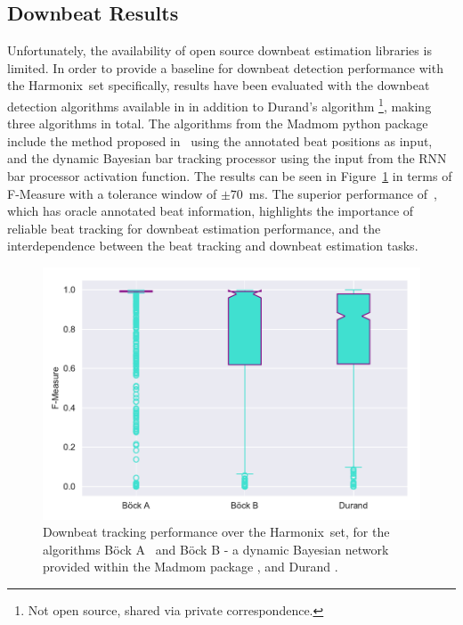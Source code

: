 \documentclass{article}
\newcommand{\setName}{Harmonix}
\begin{document}
\subsection{Downbeat Results}

Unfortunately, the availability of open source downbeat estimation libraries is limited. In order to provide a baseline for downbeat detection performance
with the \setName~set specifically, results have been evaluated with the downbeat detection algorithms available in \cite{Bock2016b} in addition to Durand's algorithm \cite{Durand2016}\footnote{Not open source, shared via private correspondence.}, making three algorithms in total.
The algorithms from the Madmom python package \cite{Bock2016b} include the method proposed in~\cite{Bock2016} using the annotated beat positions as input, and the dynamic Bayesian bar tracking processor using the input from the RNN bar processor activation
function. The results can be seen in Figure~\ref{fig:downbeat_results} in terms of F-Measure with a tolerance window of $\pm 70$~ms. The superior performance of~\cite{Bock2016}, which has oracle annotated beat information, highlights the importance
of reliable beat tracking for downbeat estimation performance, and the interdependence between the beat tracking and downbeat estimation tasks.

\begin{figure}
    \centerline{\includegraphics[width=\columnwidth]{figs/2019_06_23_20_24_26_Downbeat_ResF-Measure.pdf}}
    \caption{Downbeat tracking performance over the \setName~set, for the algorithms B{\"o}ck A~\cite{Bock2016} and B{\"o}ck B - a dynamic Bayesian network provided within the Madmom package \cite{Bock2016b}, and Durand \cite{Durand2016}.}
    \label{fig:downbeat_results}
\end{figure}
\end{document}

